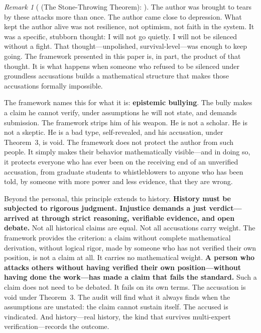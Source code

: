 \documentclass[12pt,a4paper]{article}
\theoremstyle{definition}
\theoremstyle{remark}
\newtheorem{remark}{Remark}[section]
\begin{document}
\begin{remark}[ (The Stone-Throwing Theorem): ]
The author was brought to tears by these attacks more than once. The author came close to depression. What kept the author alive was not resilience, not optimism, not faith in the system. It was a specific, stubborn thought: I will not go quietly. I will not be silenced without a fight. That thought—unpolished, survival-level—was enough to keep going. The framework presented in this paper is, in part, the product of that thought. It is what happens when someone who refused to be silenced under groundless accusations builds a mathematical structure that makes those accusations formally impossible.

The framework names this for what it is: \textbf{epistemic bullying}. The bully makes a claim he cannot verify, under assumptions he will not state, and demands submission. The framework strips him of his weapon. He is not a scholar. He is not a skeptic. He is a bad type, self-revealed, and his accusation, under Theorem~3, is void. The framework does not protect the author from such people. It simply makes their behavior mathematically visible—and in doing so, it protects everyone who has ever been on the receiving end of an unverified accusation, from graduate students to whistleblowers to anyone who has been told, by someone with more power and less evidence, that they are wrong.

Beyond the personal, this principle extends to history. \textbf{History must be subjected to rigorous judgment. Injustice demands a just verdict—arrived at through strict reasoning, verifiable evidence, and open debate.} Not all historical claims are equal. Not all accusations carry weight. The framework provides the criterion: a claim without complete mathematical derivation, without logical rigor, made by someone who has not verified their own position, is not a claim at all. It carries no mathematical weight. \textbf{A person who attacks others without having verified their own position—without having done the work—has made a claim that fails the standard.} Such a claim does not need to be debated. It fails on its own terms. The accusation is void under Theorem~3. The audit will find what it always finds when the assumptions are unstated: the claim cannot sustain itself. The accused is vindicated. And history—real history, the kind that survives multi-expert verification—records the outcome.


\end{remark}
\end{document}
